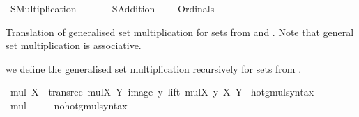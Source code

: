 %
\begin{isabellebody}%
%
%
\isadelimdocument
%
\endisadelimdocument
%
\isatagdocument
\isanewline
%
\isamarkuptrue%
%
\endisatagdocument
{\isafolddocument}%
%
\isadelimdocument
%
\endisadelimdocument
%
\isadelimtheory
%
\endisadelimtheory
%
\isatagtheory
{}\isamarkupfalse%
\ SMultiplication\isanewline
\ \ \isanewline
\ \ \ \ SAddition\isanewline
\ \ \ \ Ordinals\isanewline
{}%
\endisatagtheory
{\isafoldtheory}%
%
\isadelimtheory
%
\endisadelimtheory
%
\isadelimdocument
%
\endisadelimdocument
%
\isatagdocument
%
\isamarkuptrue%
%
\endisatagdocument
{\isafolddocument}%
%
\isadelimdocument
%
\endisadelimdocument
%
\begin{isamarkuptext}%
Translation of generalised set multiplication for sets from \cite{kirby_set_arithemtics}
and \cite{ZFC_in_HOL_AFP}. Note that general set multiplication is associative.%
\end{isamarkuptext}\isamarkuptrue%
%
\isadelimdocument
%
\endisadelimdocument
%
\isatagdocument
%
\isamarkuptrue%
%
\endisatagdocument
{\isafolddocument}%
%
\isadelimdocument
%
\endisadelimdocument
%
\begin{isamarkuptext}%
we define the generalised set multiplication recursively for sets from \cite{kirby_set_arithemtics}.%
\end{isamarkuptext}\isamarkuptrue%
\isamarkupfalse%
\ {\isachardoublequoteopen}mul\ X\ {\isasymequiv}\ transrec\ {\isacharparenleft}{\kern0pt}{\isasymlambda}mulX\ Y{\isachardot}{\kern0pt}\ {\isasymUnion}{\isacharparenleft}{\kern0pt}image\ {\isacharparenleft}{\kern0pt}{\isasymlambda}y{\isachardot}{\kern0pt}\ lift\ {\isacharparenleft}{\kern0pt}mulX\ y{\isacharparenright}{\kern0pt}\ X{\isacharparenright}{\kern0pt}\ Y{\isacharparenright}{\kern0pt}{\isacharparenright}{\kern0pt}{\isachardoublequoteclose}\isanewline
\isanewline
{}\isamarkupfalse%
\ hotg{\isacharunderscore}{\kern0pt}mul{\isacharunderscore}{\kern0pt}syntax\ \ \isamarkupfalse%
\ mul\ {\isacharparenleft}{\kern0pt}\ {\isachardoublequoteopen}{\isacharasterisk}{\kern0pt}{\isachardoublequoteclose}\ {}{}{\isacharparenright}{\kern0pt}\ \isamarkupfalse%
\isanewline
{}\isamarkupfalse%
\ no{\isacharunderscore}{\kern0pt}hotg{\isacharunderscore}{\kern0pt}mul{\isacharunderscore}{\kern0pt}syntax\ \ \isamarkupfalse%

\end{isabellebody}
